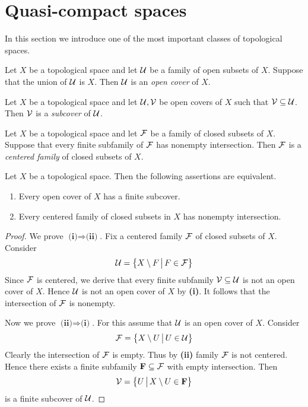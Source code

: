 \section{Quasi-compact spaces}
\noindent
In this section we introduce one of the most important classes of topological spaces.

\begin{definition}
	Let $X$ be a topological space and let ${\mathcal U}$ be a family of open subsets of $X$. Suppose that the union of ${\mathcal U}$ is $X$. Then ${\mathcal U}$ is an \textit{open cover} of $X$.
\end{definition}

\begin{definition}
	Let $X$ be a topological space and let ${\mathcal U}, {\mathcal V}$ be open covers of $X$ such that ${\mathcal V} \subseteq {\mathcal U}$. Then ${\mathcal V}$ is a \textit{subcover} of ${\mathcal U}$.
\end{definition}

\begin{definition}
	Let $X$ be a topological space and let ${\mathcal F}$ be a family of closed subsets of $X$. Suppose that every finite subfamily of ${\mathcal F}$ has nonempty intersection. Then ${\mathcal F}$ is a \textit{centered family} of closed subsets of $X$.
\end{definition}

\begin{proposition}\label{proposition:quasi-compactness_in_terms_of_open_covers_and_closed_intersections}
	Let $X$ be a topological space. Then the following assertions are equivalent.
	\begin{enumerate}[label=\emph{\textbf{(\roman*)}}, leftmargin=3.0em]
		\item Every open cover of $X$ has a finite subcover.
		\item Every centered family of closed subsets in $X$ has nonempty intersection.
	\end{enumerate}
\end{proposition}
\begin{proof}
	We prove $\textbf{(i)}\Rightarrow \textbf{(ii)}$. Fix a centered family ${\mathcal F}$ of closed subsets of $X$. Consider
	$${\mathcal U} = \big\{X\setminus F\,\big|\,F\in {\mathcal F}\big\}$$
	Since ${\mathcal F}$ is centered, we derive that every finite subfamily ${\mathcal V} \subseteq {\mathcal U}$ is not an open cover of $X$. Hence ${\mathcal U}$ is not an open cover of $X$ by \textbf{(i)}. It follows that the intersection of ${\mathcal F}$ is nonempty.

	Now we prove $\textbf{(ii)}\Rightarrow \textbf{(i)}$. For this assume that ${\mathcal U}$ is an open cover of $X$. Consider
	$${\mathcal F} = \big\{X\setminus U\,\big|\,U \in {\mathcal U}\big\}$$
	Clearly the intersection of ${\mathcal F}$ is empty. Thus by \textbf{(ii)} family ${\mathcal F}$ is not centered. Hence there exists a finite subfamily $\mathbf{F} \subseteq {\mathcal F}$ with empty intersection. Then
	$${\mathcal V} = \big\{U\,\big|\,X\setminus U \in \mathbf{F}\big\}$$
	is a finite subcover of ${\mathcal U}$.
\end{proof}

